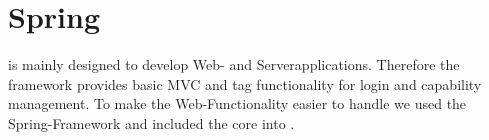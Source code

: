 \section{Spring}
\salespoint is mainly designed to develop Web- and Serverapplications. Therefore the framework provides basic MVC and tag functionality for login and capability management. To make the Web-Functionality easier to handle we used the Spring-Framework and included the core into \salespoint.
